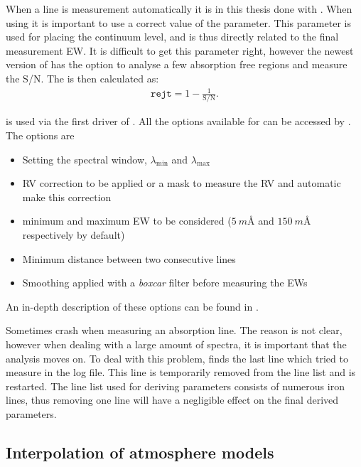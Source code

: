When a line is measurement automatically it is in this thesis done with \ARES
\citep{Sousa2007,Sousa2015a}. When using \ARES it is important to use a correct
value of the  parameter. This parameter is used for placing the
continuum level, and is thus directly related to the final measurement EW. It is
difficult to get this parameter right, however the newest version of \ARES has
the option to analyse a few absorption free regions and measure the S/N. The
 is then calculated as:
\begin{align*}
  \mathtt{rejt} = 1 - \frac{1}{\mathrm{S/N}}.
\end{align*}

\ARES is used via the first driver of \FASMA. All the options available for
\ARES can be accessed by \FASMA. The options are
\begin{itemize}
  \item Setting the spectral window, $\lambda_\mathrm{min}$ and
        $\lambda_\mathrm{max}$
  \item RV correction to be applied or a mask to measure the RV and automatic
        make this correction
  \item minimum and maximum EW to be considered ($\SI{5}{m}$\AA{} and
        $\SI{150}{m}$\AA{} respectively by default)
  \item Minimum distance between two consecutive lines
  \item Smoothing applied with a \emph{boxcar} filter before measuring the EWs
\end{itemize}
An in-depth description of these options can be found in
\citet{Sousa2007,Sousa2015a}.

Sometimes \ARES crash when measuring an absorption line. The reason is not
clear, however when dealing with a large amount of spectra, it is important that
the analysis moves on. To deal with this problem, \FASMA finds the last line
which \ARES tried to measure in the log file. This line is temporarily removed
from the line list and \ARES is restarted. The line list used for deriving
parameters consists of numerous iron lines, thus removing one line will have a
negligible effect on the final derived parameters.



\subsection{Interpolation of atmosphere models}
\label{sec:interpolation}

